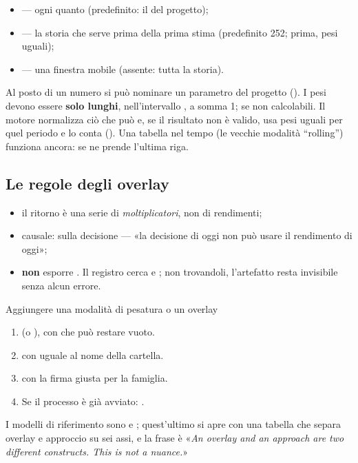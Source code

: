 \begin{itemize}
  \item {} --- ogni quanto (predefinito: il
         del progetto);
  \item {} --- la storia che serve prima della prima
        stima (predefinito \num{252}; prima, pesi uguali);
  \item {} --- una finestra mobile (assente: tutta la storia).
\end{itemize}

\noindent
Al posto di un numero si può nominare un parametro del progetto
(). I pesi devono essere
\textbf{solo lunghi}, nell'intervallo ,
a somma \num{1}; \cod{\{\}} se non calcolabili. Il motore normalizza ciò che
può e, se il risultato non è valido, usa pesi uguali per quel periodo e lo
conta (). Una tabella nel tempo (le vecchie
modalità \enquote{rolling}) funziona ancora: se ne prende l'ultima riga.

\subsection{Le regole degli overlay}

\begin{itemize}
  \item il ritorno è una serie di \emph{moltiplicatori}, non di rendimenti;
  \item causale:  sulla decisione --- «la decisione di oggi non
        può usare il rendimento di oggi»;
  \item \textbf{non} esporre . Il registro cerca
         e ; non trovandoli, l'artefatto resta
        invisibile senza alcun errore.
\end{itemize}

\begin{pratica}{Aggiungere una modalità di pesatura o un overlay}
\begin{enumerate}
  \item {} (o
        ), con
         che può restare vuoto.
  \item {} con  uguale al nome della cartella.
  \item {} con la firma giusta per la famiglia.
  \item Se il processo è già avviato:
        .
\end{enumerate}
I modelli di riferimento sono  e
; quest'ultimo si apre con una tabella
che separa overlay e approccio su sei assi, e la frase è «\emph{An overlay and
an approach are two different constructs. This is not a nuance.}»
\end{pratica}
